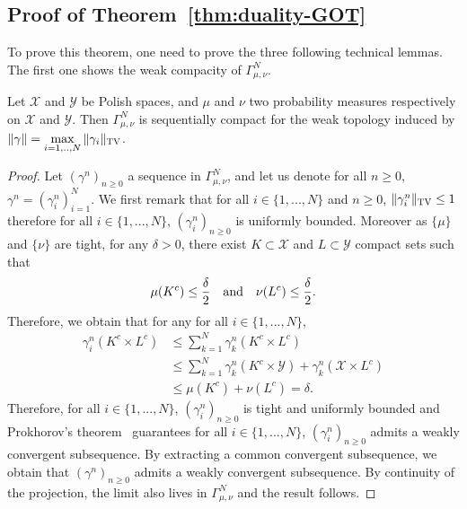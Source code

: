 \subsection{Proof of Theorem~\ref{thm:duality-GOT}}
\label{prv:duality-GOT}



To prove this theorem, one need to prove the three following technical lemmas. The first one shows the weak compacity of $\Gamma^N_{\mu,\nu}$.

\begin{lemma}
\label{lem:compact-weak}
Let $\mathcal{X}$ and $\mathcal{Y}$ be Polish spaces, and $\mu$ and $\nu$ two probability measures respectively on  $\mathcal{X}$ and $\mathcal{Y}$. Then $\Gamma^N_{\mu,\nu}$  is sequentially compact for the weak topology induced by $\Vert \gamma \Vert = \max\limits_{i=1,..,N} \Vert \gamma_i\Vert_{\textsc{TV}}$. 
\end{lemma}


\begin{proof}
Let $(\gamma^n)_{n\geq 0}$ a sequence in $\Gamma^N_{\mu,\nu}$, and let us denote for all $n\geq 0$, $\gamma^n=(\gamma^n_i)_{i=1}^N$. We first remark that for all $i\in\{1,...,N\}$ and $n\geq 0$, $\Vert \gamma_i^n\Vert_{\textsc{TV}}\leq 1$ therefore for all $i\in\{1,...,N\}$, $(\gamma^n_i)_{n\geq 0}$ is uniformly bounded. Moreover as $\{\mu\}$ and $\{\nu\}$ are tight, for any $\delta>0$, there exist $K\subset \mathcal{X} $ and $L\subset \mathcal{Y}$ compact sets such that 
\begin{align}
    \mu(K^c)\leq \frac{\delta}{2} \text{\quad and\quad }  \nu(L^c)\leq \frac{\delta}{2}.
\end{align}
Therefore, we obtain that for any for all $i\in\{1,...,N\}$,
\begin{align}
    \gamma_i^n(K^c\times L^c)&\leq \sum_{k=1}^N \gamma_k^n(K^c\times L^c)\\
    &\leq  \sum_{k=1}^N \gamma_k^n(K^c\times\mathcal{Y})+\gamma_k^n(\mathcal{X}\times L^c)\\
    &\leq  \mu(K^c) + \nu(L^c) = \delta.
\end{align}
Therefore, for all $i\in\{1,...,N\}$,  $(\gamma_i^n)_{n\geq 0}$ is tight and uniformly bounded and Prokhorov's theorem~\citep[Theorem A.3.15]{dupuis2011weak} guarantees for all $i\in\{1,...,N\}$,  $(\gamma_i^n)_{n\geq 0}$ admits a weakly convergent subsequence. By extracting a common convergent subsequence, we obtain that $(\gamma^n)_{n\geq 0}$ admits a weakly convergent subsequence. By continuity of the projection, the limit also lives in $\Gamma
^N_{\mu,\nu}$ and the result follows.
\end{proof}

